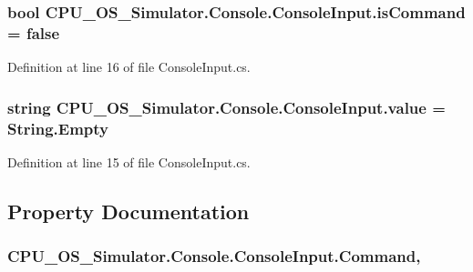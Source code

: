 \subsubsection[{is\+Command}]{\setlength{\rightskip}{0pt plus 5cm}bool C\+P\+U\+\_\+\+O\+S\+\_\+\+Simulator.\+Console.\+Console\+Input.\+is\+Command = false\hspace{0.3cm}{\ttfamily [private]}}\label{class_c_p_u___o_s___simulator_1_1_console_1_1_console_input_a56609a7b8e3d6bda9e166198e3a176c0}


Definition at line 16 of file Console\+Input.\+cs.

\hypertarget{class_c_p_u___o_s___simulator_1_1_console_1_1_console_input_a859295836e526e9b8b5e3da265caa177}{}
\subsubsection[{value}]{\setlength{\rightskip}{0pt plus 5cm}string C\+P\+U\+\_\+\+O\+S\+\_\+\+Simulator.\+Console.\+Console\+Input.\+value = String.\+Empty\hspace{0.3cm}{\ttfamily [private]}}\label{class_c_p_u___o_s___simulator_1_1_console_1_1_console_input_a859295836e526e9b8b5e3da265caa177}


Definition at line 15 of file Console\+Input.\+cs.



\subsection{Property Documentation}
\hypertarget{class_c_p_u___o_s___simulator_1_1_console_1_1_console_input_a86a4918cd4a894e9af4fd6a5eced98ea}{}
\subsubsection[{Command}]{ C\+P\+U\+\_\+\+O\+S\+\_\+\+Simulator.\+Console.\+Console\+Input.\+Command\hspace{0.3cm}{\ttfamily [get]}, {\ttfamily [set]}}\label{class_c_p_u___o_s___simulator_1_1_console_1_1_console_input_a86a4918cd4a894e9af4fd6a5eced98ea}


